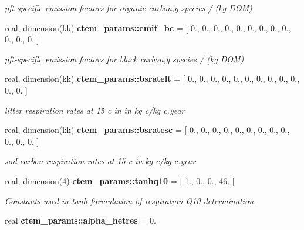 \begin{DoxyCompactItemize}
\begin{DoxyCompactList}\small\item\em pft-\/specific emission factors for organic carbon,g species / (kg D\+O\+M) \end{DoxyCompactList}\item 
\hypertarget{namespacectem__params_a4cee3e6d838d5971990e283211e601e6}{}real, dimension(kk) {\bfseries ctem\+\_\+params\+::emif\+\_\+bc} = \mbox{[} 0., 0., 0., 0., 0., 0., 0., 0., 0., 0., 0., 0. \mbox{]}\label{namespacectem__params_a4cee3e6d838d5971990e283211e601e6}

\begin{DoxyCompactList}\small\item\em pft-\/specific emission factors for black carbon,g species / (kg D\+O\+M) \end{DoxyCompactList}\item 
\hypertarget{namespacectem__params_a9ba355c48c189d4bbe0db06896779c1f}{}real, dimension(kk) {\bfseries ctem\+\_\+params\+::bsratelt} = \mbox{[} 0., 0., 0., 0., 0., 0., 0., 0., 0., 0., 0., 0. \mbox{]}\label{namespacectem__params_a9ba355c48c189d4bbe0db06896779c1f}

\begin{DoxyCompactList}\small\item\em litter respiration rates at 15 c in in kg c/kg c.\+year \end{DoxyCompactList}\item 
\hypertarget{namespacectem__params_a25b64781ac846ded3ac9024e4b4074bb}{}real, dimension(kk) {\bfseries ctem\+\_\+params\+::bsratesc} = \mbox{[} 0., 0., 0., 0., 0., 0., 0., 0., 0., 0., 0., 0. \mbox{]}\label{namespacectem__params_a25b64781ac846ded3ac9024e4b4074bb}

\begin{DoxyCompactList}\small\item\em soil carbon respiration rates at 15 c in kg c/kg c.\+year \end{DoxyCompactList}\item 
\hypertarget{namespacectem__params_a04f581d88bb99a2d4d4128f684a46ba6}{}real, dimension(4) {\bfseries ctem\+\_\+params\+::tanhq10} = \mbox{[} 1., 0., 0., 46. \mbox{]}\label{namespacectem__params_a04f581d88bb99a2d4d4128f684a46ba6}

\begin{DoxyCompactList}\small\item\em Constants used in tanh formulation of respiration Q10 determination. \end{DoxyCompactList}\item 
\hypertarget{namespacectem__params_a403de9621ddedbe9dcc984bb874e8298}{}real {\bfseries ctem\+\_\+params\+::alpha\+\_\+hetres} = 0.\label{namespacectem__params_a403de9621ddedbe9dcc984bb874e8298}


\end{DoxyCompactItemize}
